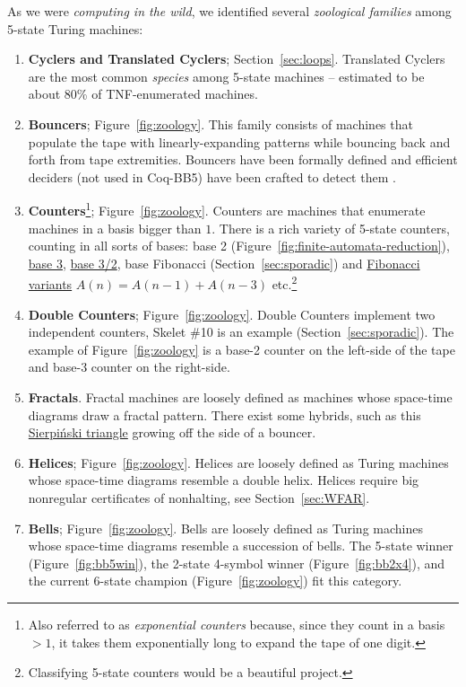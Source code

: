\documentclass[a4paper,british]{article}
\theoremstyle{definition} %
\numberwithin{equation}{section}
\theoremstyle{definition} %
\newcommand{\CoqBB}{Coq-BB5\xspace}
\begin{document}
As we were \textit{computing in the wild}, we identified several \textit{zoological families} among 5-state Turing machines:

\begin{enumerate}
    \item \textbf{Cyclers and Translated Cyclers}; Section~\ref{sec:loops}. Translated Cyclers are the most common \textit{species} among 5-state machines -- estimated to be about 80\% of TNF-enumerated machines.
    \item \textbf{Bouncers}; Figure~\ref{fig:zoology}. This family consists of machines that populate the tape with linearly-expanding patterns while bouncing back and forth from tape extremities. Bouncers have been formally defined and efficient deciders (not used in \CoqBB) have been crafted to detect them \cite{bbchallenge_part1}.
    \item \textbf{Counters}\footnote{Also referred to as \textit{exponential counters} because, since they count in a basis $> 1$, it takes them exponentially long to expand the tape of one digit.}; Figure~\ref{fig:zoology}. Counters are machines that enumerate machines in a basis bigger than $1$. There is a rich variety of 5-state counters, counting in all sorts of bases: base 2 (Figure~\ref{fig:finite-automata-reduction}), \href{https://bbchallenge.org/1RB1RB_1RC0LD_1LD1RA_---1LE_0RA0LE }{base 3}, \href{https://bbchallenge.org/1LB1RC_0LE0RA_1LD1RA_0RA1LB_0RD0LB}{base 3/2}, base Fibonacci (Section~\ref{sec:sporadic}) and \href{https://bbchallenge.org/1RB1RA_0LC1LC_0RD1LD_0RA0LB}{Fibonacci variants} $A(n) = A(n-1) + A(n-3)$ etc.\footnote{Classifying 5-state counters would be a beautiful project.}
    \item \textbf{Double Counters}; Figure~\ref{fig:zoology}. Double Counters implement two independent counters, Skelet \#10 is an example (Section~\ref{sec:sporadic}). The example of Figure~\ref{fig:zoology} is a base-2 counter on the left-side of the tape and base-3 counter on the right-side.
    \item \textbf{Fractals}. Fractal machines are loosely defined as machines whose space-time diagrams draw a fractal pattern. There exist some hybrids, such as this \href{https://bbchallenge.org/1RB1RC_1RC1RB_1LD0RA_---1LE_0LD0LA&s=20000}{Sierpiński triangle} growing off the side of a bouncer.
    \item \textbf{Helices}; Figure~\ref{fig:zoology}. Helices are loosely defined as Turing machines whose space-time diagrams resemble a double helix. Helices require big nonregular certificates of nonhalting, see Section~\ref{sec:WFAR}.
    \item \textbf{Bells}; Figure~\ref{fig:zoology}. Bells are loosely defined as Turing machines whose space-time diagrams resemble a succession of bells. The 5-state winner (Figure~\ref{fig:bb5win}), the 2-state 4-symbol winner (Figure~\ref{fig:bb2x4}), and the current 6-state champion (Figure~\ref{fig:zoology}) fit this category.
\end{enumerate}
\end{document}
